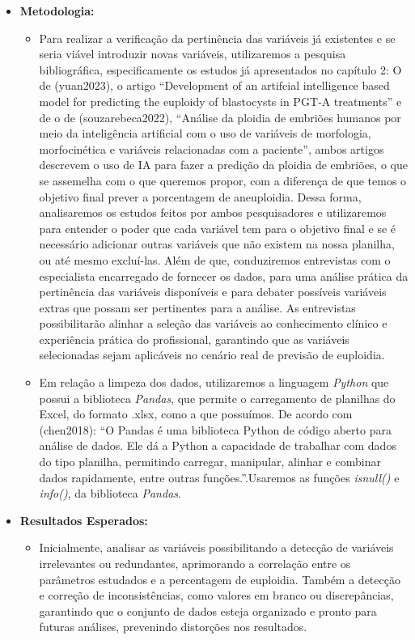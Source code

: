 \begin{itemize}
\begin{itemize}
\begin{itemize}
        \item \textbf{Metodologia:} 
        \begin{itemize}
          \item Para realizar a verificação da pertinência das variáveis já existentes e se seria viável introduzir novas variáveis, utilizaremos a pesquisa bibliográfica, especificamente os estudos já apresentados no capítulo 2: O de \citeonline(yuan2023), o artigo “Development of an artifcial intelligence based model for predicting the euploidy of blastocysts in PGT‐A treatments” e de o de \citeonline(souzarebeca2022), “Análise da ploidia de embriões humanos por meio da inteligência artificial com o uso de variáveis de morfologia, morfocinética e variáveis relacionadas com a paciente”, ambos artigos descrevem o uso de IA para fazer a predição da ploidia de embriões, o que se assemelha com o que queremos propor, com a diferença de que temos o objetivo final prever a porcentagem de aneuploidia. Dessa forma, analisaremos os estudos feitos por ambos pesquisadores e utilizaremos para entender o poder que cada variável tem para o objetivo final e se é necessário adicionar outras variáveis que não existem na nossa planilha, ou até mesmo excluí-las. Além de que, conduziremos entrevistas com o especialista encarregado de fornecer os dados, para uma análise prática da pertinência das variáveis disponíveis e para debater possíveis variáveis extras que possam ser pertinentes para a análise. As entrevistas possibilitarão alinhar a seleção das variáveis ao conhecimento clínico e experiência prática do profissional, garantindo que as variáveis selecionadas sejam aplicáveis no cenário real de previsão de euploidia. 
          \item Em relação a limpeza dos dados, utilizaremos a linguagem \textit{Python} que possui a biblioteca \textit{Pandas}, que permite o carregamento de planilhas do Excel, do formato .xlsx, como a que possuímos. De acordo com \citeonline(chen2018): “O Pandas é uma biblioteca Python de código aberto para análise de dados. Ele dá a Python a capacidade de trabalhar com dados do tipo planilha, permitindo carregar, manipular, alinhar e combinar dados rapidamente, entre outras funções.”.Usaremos as funções \textit{isnull()} e \textit{info()}, da biblioteca \textit{Pandas}.
        \end{itemize}

        \item \textbf{Resultados Esperados:} 
        \begin{itemize}
          \item Inicialmente, analisar as variáveis possibilitando a detecção de variáveis irrelevantes ou redundantes, aprimorando a correlação entre os parâmetros estudados e a percentagem de euploidia. Também a detecção e correção de inconsistências, como valores em branco ou discrepâncias, garantindo que o conjunto de dados esteja organizado e pronto para futuras análises, prevenindo distorções nos resultados. 
        \end{itemize}
      \end{itemize}


\end{itemize}
\end{itemize}
